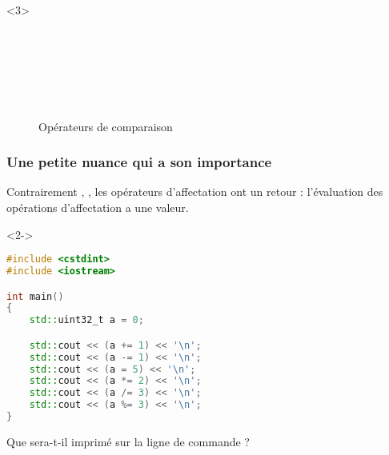 \documentclass{cppcourses}
\begin{document}
\begin{frame}
\begin{onlyenv}
\end{onlyenv}

\begin{onlyenv}<3>

\begin{figure}
 \\
 \\
 \\
 \\
 \\
\caption{Opérateurs de comparaison}
\end{figure}

\end{onlyenv}

\end{frame}

\begin{frame}[fragile]

\frametitle{Une petite nuance qui a son importance}

Contrairement , , les opérateurs d'affectation ont un retour : l'évaluation des opérations d'affectation a une valeur.

\begin{example}<2->

\begin{lstlisting}[language = c++]
#include <cstdint>
#include <iostream>

int main()
{
    std::uint32_t a = 0;

    std::cout << (a += 1) << '\n';
    std::cout << (a -= 1) << '\n';
    std::cout << (a = 5) << '\n';
    std::cout << (a *= 2) << '\n';
    std::cout << (a /= 3) << '\n';
    std::cout << (a %= 3) << '\n';
}
\end{lstlisting}

Que sera-t-il imprimé sur la ligne de commande ?


\end{example}

\end{frame}
\end{document}
